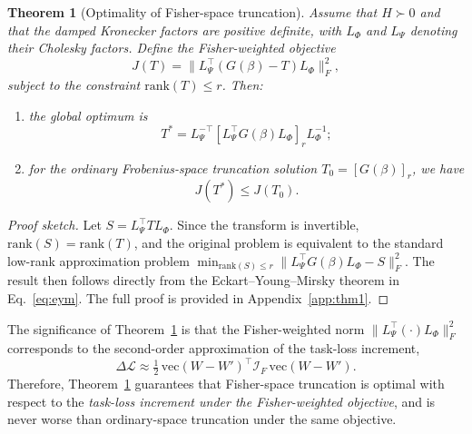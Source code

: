 \documentclass[a4paper,fleqn]{cas-dc}
\newtheorem{theorem}{Theorem}
\begin{document}
\begin{theorem}[Optimality of Fisher-space truncation]\label{thm:fisher}
Assume that $H \succ 0$ and that the damped Kronecker factors are positive definite, with $L_\Phi$ and $L_\Psi$ denoting their Cholesky factors. Define the Fisher-weighted objective
\begin{equation}
J(T) = \|L_\Psi^\top (G(\beta) - T)L_\Phi\|_F^2,
\end{equation}
subject to the constraint $\mathrm{rank}(T) \le r$. Then:
\begin{enumerate}[leftmargin=1.5em,label=(\arabic*)]
    \item the global optimum is
    \begin{equation}
    T^* = L_\Psi^{-\top}[L_\Psi^\top G(\beta)L_\Phi]_r L_\Phi^{-1};
    \end{equation}
    \item for the ordinary Frobenius-space truncation solution $T_0 = [G(\beta)]_r$, we have
    \begin{equation}
    J(T^*) \le J(T_0).
    \end{equation}
\end{enumerate}
\end{theorem}

\begin{proof}[Proof sketch]
Let $S = L_\Psi^\top T L_\Phi$. Since the transform is invertible, $\mathrm{rank}(S) = \mathrm{rank}(T)$, and the original problem is equivalent to the standard low-rank approximation problem $\min_{\mathrm{rank}(S) \le r} \|L_\Psi^\top G(\beta)L_\Phi - S\|_F^2$. The result then follows directly from the Eckart--Young--Mirsky theorem in Eq.~\eqref{eq:eym}. The full proof is provided in Appendix~\ref{app:thm1}.
\end{proof}

\begin{rmk}
The significance of Theorem~\ref{thm:fisher} is that the Fisher-weighted norm $\|L_\Psi^\top (\cdot)L_\Phi\|_F^2$ corresponds to the second-order approximation of the task-loss increment,
\begin{equation}
\Delta \mathcal{L} \approx \tfrac{1}{2}\, \mathrm{vec}(W-W')^\top \mathcal{I}_F \, \mathrm{vec}(W-W').
\end{equation}
Therefore, Theorem~\ref{thm:fisher} guarantees that Fisher-space truncation is optimal with respect to the \emph{task-loss increment under the Fisher-weighted objective}, and is never worse than ordinary-space truncation under the same objective.
\end{rmk}
\end{document}

